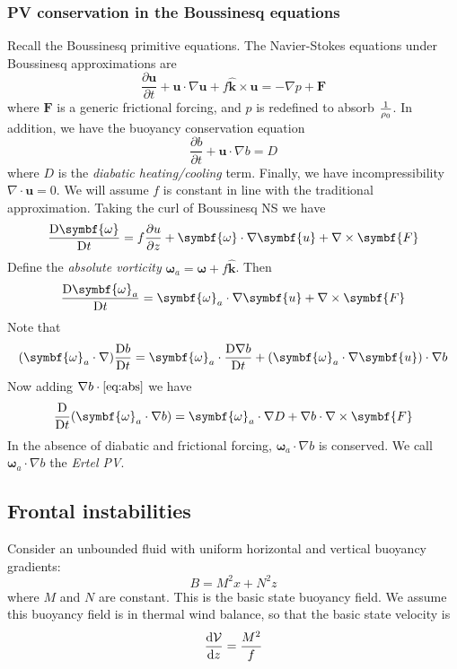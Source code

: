 \documentclass{jknotes}
\begin{document}
\subsubsection{PV conservation in the Boussinesq equations}
Recall the Boussinesq primitive equations. The Navier-Stokes equations under
Boussinesq approximations are
\begin{equation}
	\frac{\partial \symbf{u}}{\partial t} + \symbf{u}\cdot \nabla \symbf{u} +
	f \hat{\symbf{k}} \times \symbf{u} = -\nabla p + \symbf{F}
\end{equation}
where $\symbf{F}$ is a generic frictional forcing, and $p$ is redefined to
absorb $\frac{1}{\rho_0}$. In addition, we have the buoyancy conservation equation
\begin{equation}
	\frac{\partial b}{\partial t} + \symbf{u} \cdot \nabla b = D
\end{equation}
where $D$ is the \emph{diabatic heating/cooling} term. Finally, we have
incompressibility $\nabla \cdot \symbf{u} = 0$. We will assume $f$ is constant
in line with the traditional approximation. Taking the curl of Boussinesq NS
we have
\begin{equation}
	\frac{\diffD \symbf{\omega}}{\diffD t} = f\frac{\partial u}{\partial z} +
	\symbf{\omega} \cdot \nabla \symbf{u} + \nabla \times \symbf{F}
\end{equation}
Define the \emph{absolute vorticity} $\symbf{\omega}_a = \symbf{\omega} + f\hat{\symbf{k}}$. Then
\begin{equation}
	\frac{\diffD \symbf{\omega}_a}{\diffD t} = \symbf{\omega}_a \cdot \nabla
	\symbf{u} + \nabla \times \symbf{F} \label{eq:abs}
\end{equation}
Note that
\begin{equation}
	(\symbf{\omega}_a\cdot\nabla)\frac{\diffD b}{\diffD t} = \symbf{\omega}_a
	\cdot \frac{\diffD \nabla b}{\diffD t} + (\symbf{\omega}_a \cdot \nabla
	\symbf{u})\cdot\nabla b
\end{equation}
Now adding $\nabla b \cdot \eqref{eq:abs}$ we have
\begin{equation}
	\frac{\diffD}{\diffD t} (\symbf{\omega}_a \cdot \nabla b) =
	\symbf{\omega}_a \cdot \nabla D + \nabla b \cdot \nabla \times \symbf{F}
\end{equation}
In the absence of diabatic and frictional forcing, $\symbf{\omega}_a \cdot
\nabla b$ is conserved. We call $\symbf{\omega}_a \cdot \nabla b$ the
\emph{Ertel PV}.

\subsection{Frontal instabilities}
Consider an unbounded fluid with uniform horizontal and vertical buoyancy
gradients:
\begin{equation}
	B = M^2 x + N^2 z
\end{equation}
where $M$ and $N$ are constant. This is the basic state buoyancy field. We
assume this buoyancy field is in thermal wind balance, so that the basic state
velocity is
\begin{equation}
	\frac{\diffd \mathcal{V}}{\diffd z} = \frac{M^2}{f}
\end{equation}
\end{document}
